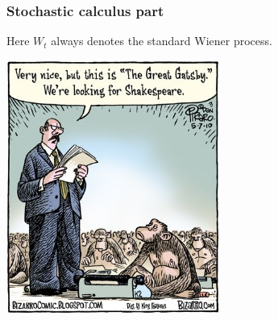 \documentclass[pdftex,12pt,a4paper]{article}
\begin{document}
\subsubsection*{Stochastic calculus part}

Here $W_t$ always denotes the standard Wiener process. 

\vspace{10pt}

\begin{center}
\includegraphics[width=7cm]{gatsby}
\end{center}

\vspace{10pt}
\end{document}
